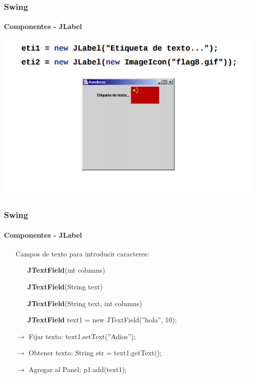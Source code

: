\documentclass{beamer}
\begin{document}
    \begin{frame}
		\frametitle{Swing}
		\framesubtitle{Componentes - JLabel}

        \begin{center}
	        	\includegraphics[scale=.45]{images/ejemplo-jlabel.png}
	    \end{center}
	\end{frame}	

    \begin{frame}
		\frametitle{Swing}
		\framesubtitle{Componentes - JLabel}

        \begin{itemize}
		    \item[\checkmark] Campos de texto para introducir caracteres:
		    \begin{itemize}
        		    \item[] \textbf{JTextField}(int columns)
        		    \item[] \textbf{JTextField}(String text)
        		    \item[] \textbf{JTextField}(String text, int columns)
        		    \item[] \textbf{JTextField} text1 = new JTextField(''hola'', 10);
	    	    \end{itemize}
	    	    \item[$\rightarrow$] Fijar texto: text1.setText(''Adios'');
	    	    \item[$\rightarrow$] Obtener texto: String str = text1.getText();
	    	    \item[$\rightarrow$] Agregar al Panel: p1.add(text1);
		\end{itemize}
	\end{frame}	
\end{document}
